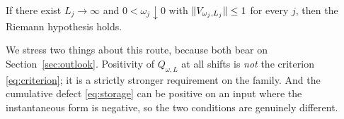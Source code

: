 \begin{proposition}\label{prop:route}
If there exist $L_j\to\infty$ and $0<\omega_j\downarrow0$ with
$\lVert V_{\omega_j,L_j}\rVert\leq1$ for every $j$, then the Riemann hypothesis holds.
\end{proposition}

We stress two things about this route, because both bear on
Section~\ref{sec:outlook}. Positivity of $Q_{\omega,L}$ at all shifts is
\emph{not} the criterion \eqref{eq:criterion}; it is a strictly stronger
requirement on the family. And the cumulative defect \eqref{eq:storage} can be
positive on an input where the instantaneous form is negative, so the two
conditions are genuinely different.
